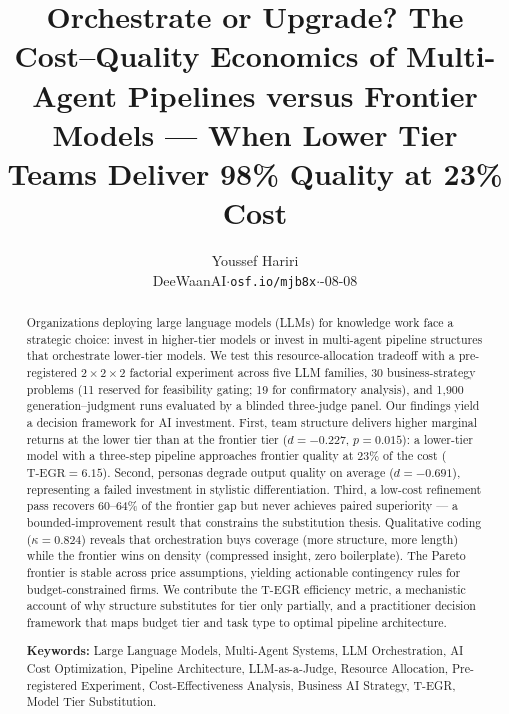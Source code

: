 \documentclass[12pt,a4paper]{article}
\title{\textbf{Orchestrate or Upgrade? The Cost--Quality Economics of
Multi-Agent Pipelines versus Frontier Models --- When Lower Tier Teams
Deliver 98\% Quality at 23\% Cost}}
\author{Youssef Hariri\\
\small DeeWaanAI\quad $\cdot$\quad \texttt{osf.io/mjb8x}\quad $\cdot$\quad 2026-08-08}
\date{}
\newcommand{\TEGR}{\ensuremath{\text{T-EGR}}}
\begin{document}
\maketitle

\begin{abstract}
\noindent
Organizations deploying large language models (LLMs) for knowledge work face a
strategic choice: invest in higher-tier models or invest in multi-agent pipeline
structures that orchestrate lower-tier models. We test this resource-allocation
tradeoff with a pre-registered $2 \times 2 \times 2$ factorial experiment across
five LLM families, 30 business-strategy problems (11 reserved for feasibility
gating; 19 for confirmatory analysis), and 1{,}900
generation--judgment runs evaluated by a blinded three-judge panel. Our findings
yield a decision framework for AI investment. First, team structure delivers
higher marginal returns at the lower tier than at the frontier tier
($d = -0.227$, $p = 0.015$): a lower-tier model with a three-step pipeline
approaches frontier quality at 23\% of the cost ($\TEGR = 6.15$). Second,
personas degrade output quality on average ($d = -0.691$), representing a
failed investment in stylistic differentiation. Third, a low-cost refinement
pass recovers 60--64\% of the frontier gap but never achieves paired
superiority --- a bounded-improvement result that constrains the substitution
thesis. Qualitative coding ($\kappa = 0.824$) reveals that orchestration buys
coverage (more structure, more length) while the frontier wins on density
(compressed insight, zero boilerplate). The Pareto frontier is stable across
price assumptions, yielding actionable contingency rules for budget-constrained
firms. We contribute the T-EGR efficiency metric, a mechanistic account of why
structure substitutes for tier only partially, and a practitioner decision
framework that maps budget tier and task type to optimal pipeline architecture.

\medskip
\noindent\textbf{Keywords:} Large Language Models, Multi-Agent Systems, LLM Orchestration,
AI Cost Optimization, Pipeline Architecture, LLM-as-a-Judge, Resource
Allocation, Pre-registered Experiment, Cost-Effectiveness Analysis, Business
AI Strategy, T-EGR, Model Tier Substitution.
\end{abstract}

\bigskip
\end{document}

